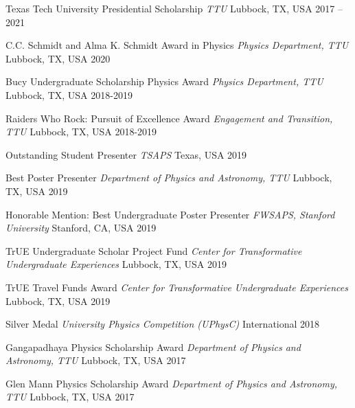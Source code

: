 

\begin{cvhonors}

    \cvhonor
    {Texas Tech University Presidential Scholarship}
    {\textit{\scriptsize TTU}}
    {Lubbock, TX, USA}
    {2017 -- 2021}

    \cvhonor
    {C.C. Schmidt and Alma K. Schmidt Award in Physics}
    {\textit{\scriptsize Physics Department, TTU}}
    {Lubbock, TX, USA}
    {2020}

    \cvhonor
    {Bucy Undergraduate Scholarship Physics Award}
    {\textit{\scriptsize Physics Department, TTU}}
    {Lubbock, TX, USA}
    {2018-2019}

    \cvhonor
    {Raiders Who Rock:  Pursuit of Excellence Award}
    {\textit{\scriptsize Engagement and Transition, TTU}}
    {Lubbock, TX, USA}
    {2018-2019}

    \cvhonor
    {Outstanding Student Presenter}
    {\textit{\scriptsize TSAPS}}
    {Texas, USA}
    {2019}

    \cvhonor
    {Best Poster Presenter}
    {\textit{\scriptsize Department of Physics and Astronomy, TTU}}
    {Lubbock, TX, USA}
    {2019}

    \cvhonor
    {Honorable Mention: Best Undergraduate Poster Presenter}
    {\textit{\scriptsize FWSAPS, Stanford University}}
    {Stanford, CA, USA}
    {2019}

    \cvhonor
    {TrUE Undergraduate Scholar Project Fund}
    {\textit{\scriptsize Center for Transformative Undergraduate Experiences}}
    {Lubbock, TX, USA}
    {2019}

    \cvhonor
    {TrUE Travel Funds Award}
    {\textit{\scriptsize Center for Transformative Undergraduate Experiences}}
    {Lubbock, TX, USA}
    {2019}

    \cvhonor
    {Silver Medal}
    {\textit{\scriptsize University Physics Competition (UPhysC)}}
    {International}
    {2018}

    \cvhonor
    {Gangapadhaya Physics Scholarship Award}
    {\textit{\scriptsize Department of Physics and Astronomy, TTU}}
    {Lubbock, TX, USA}
    {2017}

    \cvhonor
    {Glen Mann Physics Scholarship Award}
    {\textit{\scriptsize Department of Physics and Astronomy, TTU}}
    {Lubbock, TX, USA}
    {2017}

\end{cvhonors}
